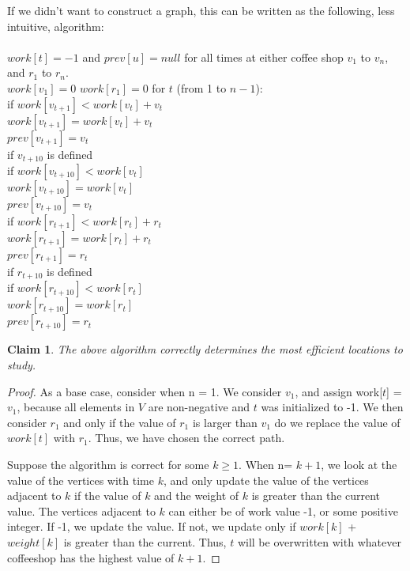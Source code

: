 \documentclass[11pt]{article}
\newtheorem{claim}[theorem]{Claim}
\begin{document}
\newpage
\onecolumn
\noindent
If we didn't want to construct a graph, this can be written as the following, less intuitive, algorithm:\\
\\
$work[t] = -1$ and $prev[u] = null$ for all times at either coffee shop $v_1$ to $v_n$, and $r_1$ to $r_n$.\\
$work[v_1] = 0$
$work[r_1] = 0$
for $t$ (from 1 to $n-1$):\\
\indent if $work[v_{t+1}] < work[v_{t}] + v_t$\\
\indent \indent $work[v_{t+1}] = work[v_{t}] + v_t$\\
\indent \indent $prev[v_{t+1}] = v_{t}$\\
\indent if $v_{t+10}$ is defined\\
\indent \indent if $work[v_{t+10}] < work[v_{t}]$\\
\indent \indent \indent $work[v_{t+10}] = work[v_{t}]$\\
\indent \indent \indent $prev[v_{t+10}] = v_{t}$\\
\indent if $work[r_{t+1}] < work[r_{t}] + r_t$\\
\indent \indent $work[r_{t+1}] = work[r_{t}] + r_t$\\
\indent \indent $prev[r_{t+1}] = r_{t}$\\
\indent if $r_{t+10}$ is defined\\
\indent \indent if $work[r_{t+10}] < work[r_{t}]$\\
\indent \indent \indent $work[r_{t+10}] = work[r_{t}]$\\
\indent \indent \indent $prev[r_{t+10}] = r_{t}$\\


	\begin{claim}
		The above algorithm correctly determines the most efficient locations to study.
	\end{claim}

	\begin{proof}
		As a base case, consider when n = 1. We consider $v_1$, and assign work[$t$] = $v_1$, because all elements in $V$ are non-negative and $t$ was initialized to -1. We then consider $r_1$ and only if the value of $r_1$ is larger than $v_1$ do we replace the value of $work[t]$ with $r_1$. Thus, we have chosen the correct path.

		Suppose the algorithm is correct for some $k \geq 1$. When n= $k+1$, we look at the value of the vertices with time $k$, and only update the value of the vertices adjacent to $k$ if the value of $k$ and the weight of $k$ is greater than the current value. The vertices adjacent to $k$ can either be of work value -1, or some positive integer. If -1, we update the value. If not, we update only if $work[k]$ + $weight[k]$ is greater than the current. Thus, $t$ will be overwritten with whatever coffeeshop has the highest value of $k+1$.
	\end{proof}
\end{document}

